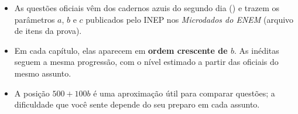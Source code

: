 
\begin{itemize}[leftmargin=1.4em,itemsep=2pt]
  \item As questões oficiais vêm dos cadernos azuis do segundo dia (\anosbanco) e trazem os
        parâmetros $a$, $b$ e $c$ publicados pelo INEP nos \emph{Microdados do ENEM}
        (arquivo de itens da prova).
  \item Em cada capítulo, elas aparecem em \textbf{ordem crescente de $b$}. As inéditas seguem a
        mesma progressão, com o nível estimado a partir das oficiais do mesmo assunto.
  \item A posição $500 + 100b$ é uma aproximação útil para comparar questões; a dificuldade que
        você sente depende do seu preparo em cada assunto.
\end{itemize}
